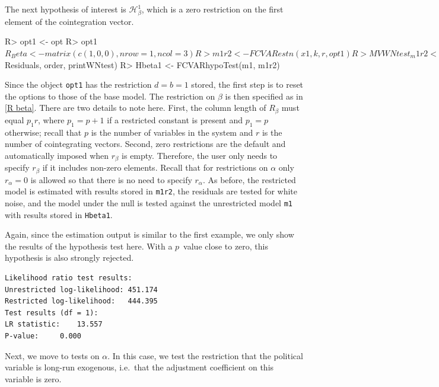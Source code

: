 \documentclass[article]{jss}
\begin{document}
The next hypothesis of interest is $\mathscr{H}_{\beta}^1$, which is a zero restriction on the first element of the cointegration vector.

\begin{Code}
R> opt1 <- opt
R> opt1$R_Beta <- matrix(c(1, 0, 0), nrow = 1, ncol = 3)
R> m1r2 <- FCVARestn(x1, k, r, opt1)
R> MVWNtest_m1r2 <- MVWNtest(m1r2$Residuals, order, printWNtest)
R> Hbeta1 <- FCVARhypoTest(m1, m1r2)
\end{Code}

Since the object \verb|opt1| has the restriction $d=b=1$ stored, the first step is to reset the options to those of the base model. The restriction on $\beta$ is then specified as in \eqref{R beta}. There are two details to note here. First, the column length of $R_{\beta}$ must equal $p_1 r$, where $p_1=p+1$ if a restricted constant is present and $p_1=p$ otherwise; recall that $p$ is the number of variables in the system and $r$ is the number of cointegrating vectors. Second, zero restrictions are the default and automatically imposed when $r_{\beta}$ is empty. Therefore, the user only needs to specify $r_{\beta}$ if it includes non-zero elements. Recall that for restrictions on $\alpha$ only $r_\alpha = 0$ is allowed so that there is no need to specify $r_\alpha$. As before, the restricted model is estimated with results stored in \verb|m1r2|, the residuals are tested for white noise, and the model under the null is tested against the unrestricted model \verb|m1| with results stored in \verb|Hbeta1|.

Again, since the estimation output is similar to the first example, we only show the results of the hypothesis test here. With a $p$~value close to zero, this hypothesis is also strongly rejected.

\begin{verbatim}
Likelihood ratio test results:
Unrestricted log-likelihood: 451.174
Restricted log-likelihood:   444.395
Test results (df = 1):
LR statistic: 	 13.557
P-value: 	 0.000
\end{verbatim}

Next, we move to tests on $\alpha$. 
In this case, we test the restriction that the political variable is long-run exogenous, 
i.e.~that the adjustment coefficient on this variable is zero.

\end{document}
